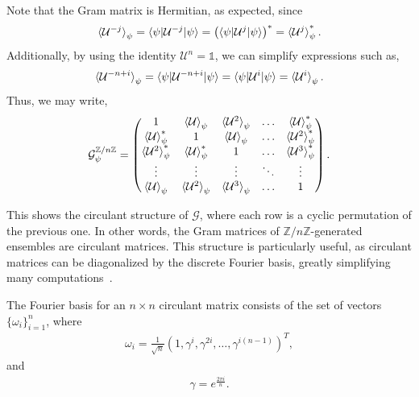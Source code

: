 \documentclass[12pt,letterpaper]{article}
\begin{document}
\begin{multicols}{2}
Note that the Gram matrix is Hermitian, as expected, since
\begin{align*}
    \braket{\mathcal{U}^{-j}}_{\psi} = \braket{\psi | \mathcal{U}^{-j} | \psi} = \left(\braket{\psi | \mathcal{U}^j | \psi}\right)^* = \braket{\mathcal{U}^j}_{\psi}^*.
\end{align*}
Additionally, by using the identity $\mathcal{U}^n = \mathds{1}$, we can simplify expressions such as,
\begin{align*}
	\braket{\mathcal{U}^{-n+i}}_\psi = \braket{\psi | \mathcal{U}^{-n+i} | \psi} = \braket{\psi | \mathcal{U}^i | \psi} = \braket{\mathcal{U}^i}_\psi.
\end{align*}
Thus, we may write,
\begin{align*}
	\mathcal{G}^{\mathbb{Z}/n\mathbb{Z}}_{\psi} = \begin{pmatrix}
 1 & \braket{\mathcal{U}}_{\psi} & \braket{\mathcal{U}^{2}}_{\psi} & \hdots &  \braket{\mathcal{U}}_{\psi}^* \\
 \braket{\mathcal{U}}_{\psi}^* & 1 & \braket{\mathcal{U}}_{\psi} & \hdots &  \braket{\mathcal{U}^{2}}_{\psi}^* \\
 \braket{\mathcal{U}^{2}}_{\psi}^* & \braket{\mathcal{U}}_{\psi}^* & 1 & \hdots &  \braket{\mathcal{U}^{3}}_{\psi}^* \\
 \vdots & \vdots & \vdots & \ddots & \vdots \\
 \braket{\mathcal{U}}_{\psi} & \braket{\mathcal{U}^{2}}_{\psi} & \braket{\mathcal{U}^{3}}_{\psi} & \hdots & 1 
\end{pmatrix}.
\end{align*}

This shows the circulant structure of $\mathcal{G}$, where each row is a cyclic permutation of the previous one. In other words, the Gram matrices of $\mathbb{Z}/n\mathbb{Z}$-generated ensembles are circulant matrices. This structure is particularly useful, as circulant matrices can be diagonalized by the discrete Fourier basis, greatly simplifying many computations~\cite{circulantMatrices}.

The Fourier basis for an $n \times n$ circulant matrix consists of the set of vectors $\{\omega_i\}_{i=1}^n$, where
\begin{align*}
	\omega_i = \frac{1}{\sqrt{n}} (1, \gamma^i, \gamma^{2i}, \ldots, \gamma^{i(n-1)})^T,
\end{align*}
and
\begin{align*}
	\gamma = e^{\frac{2\pi i}{n}}.
\end{align*}


\end{multicols}
\end{document}
